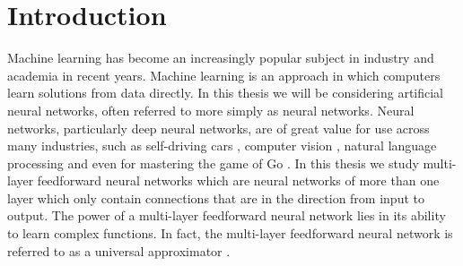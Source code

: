 \documentclass[letterpaper,12pt,titlepage,oneside,final]{book}
\begin{document}
	
	 
	
	\chapter{Introduction}
	
	Machine learning has become an increasingly popular subject in industry and academia in recent years. Machine learning is an approach in which computers learn solutions from data directly. In this thesis we will be considering artificial neural networks, often referred to more simply as neural networks. Neural networks, particularly deep neural networks, are of great value for use across many industries, such as self-driving cars \cite{bojarski2016end}, computer vision \cite{krizhevsky2012imagenet}, natural language processing \cite{ma2002natural} and even for mastering the game of Go \cite{silver2016mastering}. In this thesis we study multi-layer feedforward neural networks which are neural networks of more than one layer which only contain connections that are in the direction from input to output. The power of a multi-layer feedforward neural network lies in its ability to learn complex functions. In fact, the multi-layer feedforward neural network is referred to as a universal approximator \cite{hornik1989multilayer}. 
	
\end{document}
